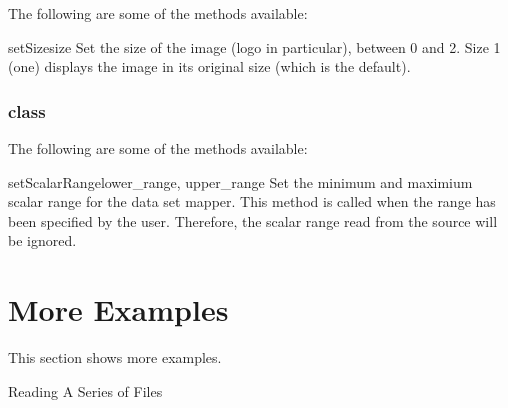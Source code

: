 The following are some of the methods available:

\begin{methoddesc}[ImageReslice]{setSize}{size}
Set the size of the image (logo in particular), between 0 and 2. Size 1 (one) 
displays the image in its original size (which is the default).
\end{methoddesc}

\subsubsection{\DataSetMapper class}

The following are some of the methods available:

\begin{methoddesc}[DataSetMapper]{setScalarRange}{lower_range, upper_range}
Set the minimum and maximium scalar range for the data set mapper. This
method is called when the range has been specified by the user.
Therefore, the scalar range read from the source will be ignored.
\end{methoddesc}



\section{More Examples}
This section shows more examples.

\textsf{Reading A Series of Files}

